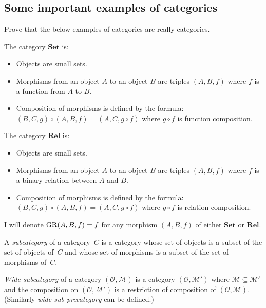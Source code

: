 \subsection{Some important examples of categories}
\begin{xca}
Prove that the below examples of categories are really categories.\end{xca}
\begin{defn}
The category $\mathbf{Set}$ is:
\begin{itemize}
\item Objects are small sets.
\item Morphisms from an object $A$ to an object $B$ are triples $(A,B,f)$
where $f$ is a function from $A$ to $B$.
\item Composition of morphisms is defined by the formula: $(B,C,g)\circ(A,B,f)=(A,C,g\circ f)$
where $g\circ f$ is function composition.
\end{itemize}
\end{defn}

\begin{defn}
The category $\mathbf{Rel}$ is:
\begin{itemize}
\item Objects are small sets.
\item Morphisms from an object $A$ to an object $B$ are triples $(A,B,f)$
where $f$ is a binary relation between $A$ and $B$.
\item Composition of morphisms is defined by the formula: $(B,C,g)\circ(A,B,f)=(A,C,g\circ f)$
where $g\circ f$ is relation composition.
\end{itemize}
\end{defn}
I will denote $\operatorname{GR}(A,B,f)=f$ for any morphism $(A,B,f)$ of either
$\mathbf{Set}$ or $\mathbf{Rel}$.


\begin{defn}
A \emph{subcategory} of a category~$C$ is a category whose set of
objects is a subset of the set of objects of~$C$ and whose set of
morphisms is a subset of the set of morphisms of~$C$.
\end{defn}

\begin{defn}
\emph{Wide subcategory} of a category $(\mathcal{O},\mathcal{M})$
is a category $(\mathcal{O},\mathcal{M}')$ where $\mathcal{M}\subseteq\mathcal{M}'$
and the composition on $(\mathcal{O},\mathcal{M}')$ is a restriction
of composition of $(\mathcal{O},\mathcal{M})$. (Similarly \emph{wide
sub-precategory} can be defined.)
\end{defn}

